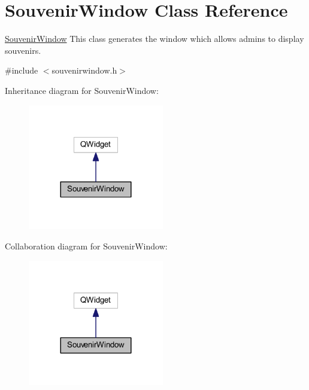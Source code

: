 \hypertarget{class_souvenir_window}{}\section{Souvenir\+Window Class Reference}
\label{class_souvenir_window}


\mbox{\hyperlink{class_souvenir_window}{Souvenir\+Window}} This class generates the window which allows admins to display souvenirs.  




{\ttfamily \#include $<$souvenirwindow.\+h$>$}



Inheritance diagram for Souvenir\+Window\+:\nopagebreak
\begin{figure}[H]
\begin{center}
\leavevmode
\includegraphics[width=168pt]{class_souvenir_window__inherit__graph}
\end{center}
\end{figure}


Collaboration diagram for Souvenir\+Window\+:\nopagebreak
\begin{figure}[H]
\begin{center}
\leavevmode
\includegraphics[width=168pt]{class_souvenir_window__coll__graph}
\end{center}
\end{figure}
